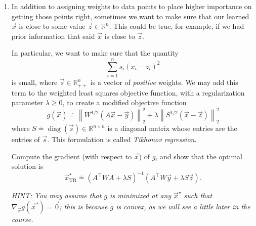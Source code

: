 \documentclass[10pt]{article}
\newcommand{\RR}{\mathbb{R}}
\begin{document}
\begin{enumerate}[label=(\alph*)]
    \item In addition to assigning weights to data points to place higher importance on getting those points right, sometimes we want to make sure that our learned $\vec{x}$ is close to some value $\vec{z} \in \RR^n$. This could be true, for example, if we had prior information that said $\vec{x}$ is close to $\vec{z}$.

    In particular, we want to make sure that the quantity
    \begin{equation}
        \sum_{i=1}^{n} s_i (x_i - z_i)^2
    \end{equation}
    is small, where $\vec{s} \in \RR^n_{++}$ is a vector of \emph{positive} weights. We may add this term to the weighted least squares objective function, with a regularization parameter $\lambda \geq 0$, to create a modified objective function
    \begin{equation}
        g(\vec{x}) \doteq \left\| W^{1/2}(A\vec{x} - \vec{y}) \right\|_2^2 + \lambda \left\| S^{1/2}(\vec{x} - \vec{z}) \right\|_2^2
    \end{equation}
    where $S \doteq \operatorname{diag}(\vec{s}) \in \RR^{n \times n}$ is a diagonal matrix whose entries are the entries of $\vec{s}$. This formulation is called \emph{Tikhonov regression}.

    Compute the gradient (with respect to $\vec{x}$) of $g$, and show that the optimal solution is
    \begin{equation}
        \vec{x}^\star_{\mathrm{TR}} \doteq (A^\top W A + \lambda S)^{-1}(A^\top W \vec{y} + \lambda S \vec{z}).
    \end{equation}

    \emph{HINT: You may assume that $g$ is minimized at any $\vec{x}^\star$ such that $\nabla_{\vec{x}} g(\vec{x}^\star) = \vec{0}$; this is because $g$ is convex, as we will see a little later in the course.}


\end{enumerate}
\end{document}
